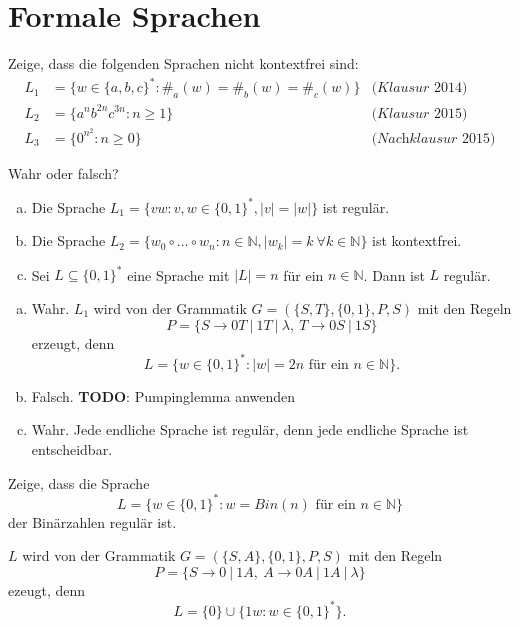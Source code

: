 \documentclass[german,headsepline]{scrartcl}
\theoremstyle{definition}
\begin{document}
	\section{Formale Sprachen}
	\begin{question}
		Zeige, dass die folgenden Sprachen nicht kontextfrei sind:
		\begin{align*}
			L_1 &= \{w\in\{a,b,c\}^*\colon \#_a(w)=\#_b(w)=\#_c(w)\} & \textit{(Klausur 2014)} \\
			L_2 &= \{a^nb^{2n}c^{3n}\colon n\geq1\} & \textit{(Klausur 2015)} \\
			L_3 &= \{0^{n^2}\colon n\geq0\} & \textit{(Nachklausur 2015)}
		\end{align*}
	\end{question}
	
	\begin{question} %
		Wahr oder falsch?
		\begin{enumerate}[(a)]
			\item Die Sprache $L_1=\{vw\colon v,w\in\{0,1\}^*,\vert v\vert=\vert w\vert\}$ ist regulär.
			\item Die Sprache $L_2=\{w_0\circ\ldots\circ w_n\colon n\in\mathbb{N},\vert w_k\vert=k~\forall k\in\mathbb{N}\}$ ist kontextfrei.
			\item Sei $L\subseteq\{0,1\}^*$ eine Sprache mit $\vert L\vert=n$ für ein $n\in\mathbb{N}$. Dann ist $L$ regulär.
		\end{enumerate}
	\end{question}
	\begin{solution}
		\begin{enumerate}[(a)]
			\item Wahr. $L_1$ wird von der Grammatik $G=(\{S,T\},\{0,1\},P,S)$ mit den Regeln
				\[P=\{S\rightarrow0T~|~1T~|~\lambda,~T\rightarrow0S~|~1S\}\]
				erzeugt, denn
				\[L=\{w\in\{0,1\}^*\colon\vert w\vert=2n\text{ für ein }n\in\mathbb{N}\}.\]
			\item Falsch. \textbf{TODO}: Pumpinglemma anwenden
			\item Wahr. Jede endliche Sprache ist regulär, denn jede endliche Sprache ist entscheidbar.
		\end{enumerate}
	\end{solution}
	
	\begin{question}
		Zeige, dass die Sprache
		\[L=\{w\in\{0,1\}^*\colon w=Bin(n)\text{ für ein }n\in\mathbb{N}\}\]
		der Binärzahlen regulär ist.
	\end{question}
	\begin{solution}
		$L$ wird von der Grammatik $G=(\{S,A\},\{0,1\},P,S)$ mit den Regeln
		\[P=\{S\rightarrow0~|~1A,~A\rightarrow0A~|~1A~|~\lambda\}\]
		ezeugt, denn
		\[L=\{0\}\cup\{1w\colon w\in\{0,1\}^*\}\text{.}\]
	\end{solution}
	
\end{document}
